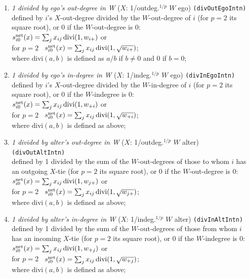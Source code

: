\documentclass[a4paper,fleqn,11pt]{article}
\newcommand{\+}{\, + \,}
\newcommand{\vit}{\theenumi}
\newcounter{savenumi}
\begin{document}
\begin{enumerate}
\setcounter{enumi}{\value{savenumi}}

 \item {\em 1 divided by ego's out-degree  in W } ($X$: 1/outdeg.$^{1/p}$ $W$ ego)
 \texttt{(divOutEgoIntn)}\\
 defined by  $i$'s $X$-out-degree divided by the $W$-out-degree of $i$
 (for $p = 2$ its square root),  or 0 if the $W$-out-degree is 0:\\[0.2em]
 $s^{\rm net}_{i\vit}(x) =  \sum_j x_{ij}\, \text{divi}(1, w_{i+}) $ or\\[0.2em]
for $p=2$ \  $s^{\rm net}_{i\vit}(x) =  \sum_j x_{ij}\,\text{divi}(1, \sqrt{w_{i+}})$;\\[0.2em]
where $\text{divi}(a,b)$ is defined as $a/b$ if $b \neq 0$ and 0 if $b=0$;


 \item {\em 1 divided by ego's in-degree  in W } ($X$: 1/indeg.$^{1/p}$ $W$ ego)
 \texttt{(divInEgoIntn)}\\
 defined by  $i$'s $X$-out-degree divided by the
  $W$-in-degree of $i$ (for $p = 2$ its square root),
 or 0 if the $W$-indegree is 0:\\[0.2em]
 $s^{\rm net}_{i\vit}(x) =  \sum_j x_{ij}\, \text{divi}(1, w_{+i}) $ or\\[0.2em]
for $p=2$ \  $s^{\rm net}_{i\vit}(x) =  \sum_j x_{ij}\,\text{divi}(1, \sqrt{w_{+i}})$;\\[0.2em]
where $\text{divi}(a,b)$ is defined as above;


 \item {\em 1 divided by alter's out-degree  in W } ($X$: 1/outdeg.$^{1/p}$ $W$ alter)
 \texttt{(divOutAltIntn)}\\
 defined by 1 divided by the sum of the $W$-out-degrees of those
 to whom $i$ has an outgoing $X$-tie
 (for $p = 2$ its square root),  or 0 if the $W$-out-degree is 0:\\[0.2em]
 $s^{\rm net}_{i\vit}(x) =  \sum_j x_{ij}\, \text{divi}(1, w_{j+}) $ or\\[0.2em]
for $p=2$ \  $s^{\rm net}_{i\vit}(x) =  \sum_j x_{ij}\,\text{divi}(1, \sqrt{w_{j+}})$;\\[0.2em]
where $\text{divi}(a,b)$ is defined as above;


 \item {\em 1 divided by alter's in-degree  in W } ($X$: 1/indeg.$^{1/p}$ $W$ alter)
 \texttt{(divInAltIntn)}\\
 defined by 1 divided by the sum of the $W$-out-degrees of those
 from whom $i$ has an incoming $X$-tie (for $p = 2$ its square root),
 or 0 if the $W$-indegree is 0:\\[0.2em]
 $s^{\rm net}_{i\vit}(x) =  \sum_j x_{ij}\, \text{divi}(1, w_{+j}) $ or\\[0.2em]
for $p=2$ \  $s^{\rm net}_{i\vit}(x) =  \sum_j x_{ij}\,\text{divi}(1, \sqrt{w_{+j}})$;\\[0.2em]
where $\text{divi}(a,b)$ is defined as above;



\end{enumerate}
\end{document}
